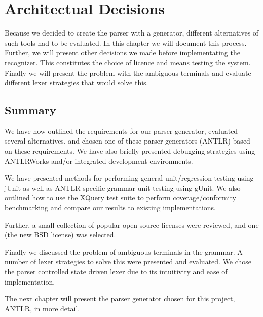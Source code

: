 \chapter{Architectual Decisions}
\label{chapter:method}
Because we decided to create the parser with a generator, different alternatives of such tools had to be evaluated. In this chapter we will document this process. Further, we will present other decisions we made before implementating the recognizer. This constitutes the choice of licence and means testing the system. Finally we will present the problem with the ambiguous terminals and evaluate different lexer strategies that would solve this.







\section{Summary}
We have now outlined the requirements for our parser generator, evaluated
several alternatives, and chosen one of these parser generators (ANTLR) based on
these requirements. We have also briefly presented debugging
strategies using ANTLRWorks and/or integrated development environments.

We have presented methods for performing general unit/regression testing
using jUnit as well as ANTLR-specific grammar unit testing using gUnit. We also
outlined how to use the XQuery test suite to perform coverage/conformity
benchmarking and compare our results to existing implementations.

Further, a small collection of popular open source licenses were reviewed, and
one (the new BSD license) was selected.

Finally we discussed the problem of ambiguous terminals in the grammar. A number of lexer strategies to solve this were presented and evaluated. We chose the parser controlled state driven lexer due to its intuitivity and ease of implementation.

The next chapter will present the parser generator chosen for this
project, ANTLR, in more detail.